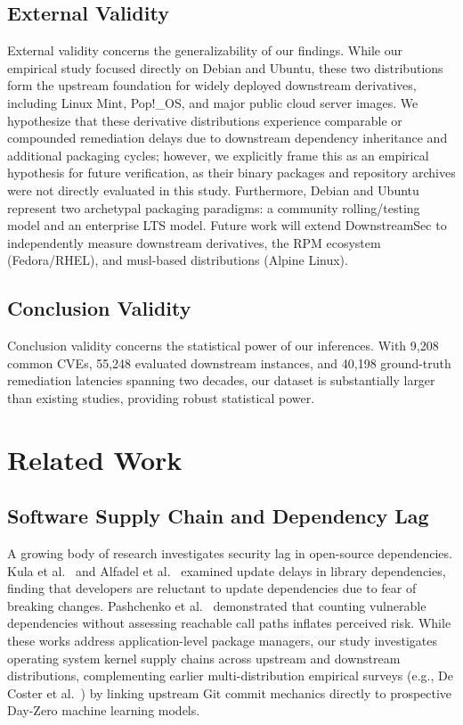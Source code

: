 \documentclass[final,5p,times,twocolumn]{elsarticle}
\begin{document}
\subsection{External Validity}
External validity concerns the generalizability of our findings. While our empirical study focused directly on Debian and Ubuntu, these two distributions form the upstream foundation for widely deployed downstream derivatives, including Linux Mint, Pop!\_OS, and major public cloud server images. We hypothesize that these derivative distributions experience comparable or compounded remediation delays due to downstream dependency inheritance and additional packaging cycles; however, we explicitly frame this as an empirical hypothesis for future verification, as their binary packages and repository archives were not directly evaluated in this study. Furthermore, Debian and Ubuntu represent two archetypal packaging paradigms: a community rolling/testing model and an enterprise LTS model. Future work will extend DownstreamSec to independently measure downstream derivatives, the RPM ecosystem (Fedora/RHEL), and musl-based distributions (Alpine Linux).

\subsection{Conclusion Validity}
Conclusion validity concerns the statistical power of our inferences. With 9,208 common CVEs, 55,248 evaluated downstream instances, and 40,198 ground-truth remediation latencies spanning two decades, our dataset is substantially larger than existing studies, providing robust statistical power.

\section{Related Work}
\label{sec:related}

\subsection{Software Supply Chain and Dependency Lag}
A growing body of research investigates security lag in open-source dependencies. Kula et al.~\citep{kula2018empirical} and Alfadel et al.~\citep{alfadel2021empirical} examined update delays in library dependencies, finding that developers are reluctant to update dependencies due to fear of breaking changes. Pashchenko et al.~\citep{pashchenko2020vulnerable} demonstrated that counting vulnerable dependencies without assessing reachable call paths inflates perceived risk. While these works address application-level package managers, our study investigates operating system kernel supply chains across upstream and downstream distributions, complementing earlier multi-distribution empirical surveys (e.g., De Coster et al.~\citep{decoster2022measuring}) by linking upstream Git commit mechanics directly to prospective Day-Zero machine learning models.
\end{document}
